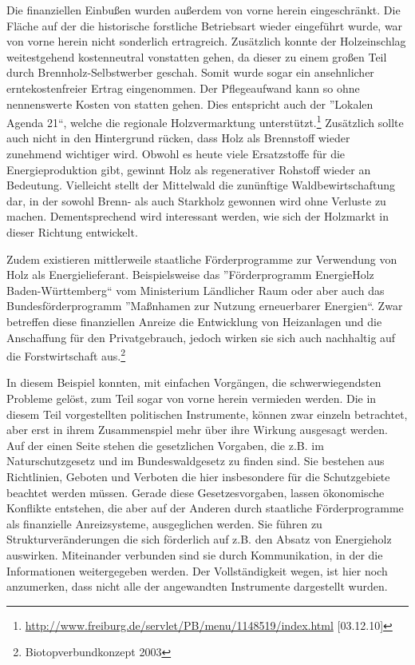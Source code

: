 \documentclass[12pt]{article}
\newcommand{\citefooturldate}[2]{\footnote{\url{#1} [#2]}}
\begin{document}
Die finanziellen Einbußen wurden außerdem von vorne herein eingeschränkt. Die Fläche auf der die historische
forstliche Betriebsart wieder eingeführt wurde, war von vorne herein nicht sonderlich ertragreich.
Zusätzlich konnte der Holzeinschlag weitestgehend kostenneutral vonstatten gehen, da dieser zu einem großen Teil
durch Brennholz-Selbstwerber geschah. Somit wurde sogar ein ansehnlicher erntekostenfreier Ertrag eingenommen.
Der Pflegeaufwand kann so ohne nennenswerte Kosten von statten gehen. Dies entspricht auch der ''Lokalen Agenda 21``,
welche die regionale Holzvermarktung unterstützt.\citefooturldate{http://www.freiburg.de/servlet/PB/menu/1148519/index.html}{03.12.10}
Zusätzlich sollte auch nicht in
den Hintergrund rücken, dass Holz als Brennstoff wieder zunehmend wichtiger wird. Obwohl es heute viele
Ersatzstoffe für die Energieproduktion gibt, gewinnt Holz als regenerativer Rohstoff wieder an Bedeutung.
Vielleicht stellt der Mittelwald die zunünftige Waldbewirtschaftung dar, in der sowohl Brenn- als auch Starkholz
gewonnen wird ohne Verluste zu machen. Dementsprechend wird interessant werden, wie sich der Holzmarkt
in dieser Richtung entwickelt. 

Zudem existieren mittlerweile staatliche Förderprogramme zur Verwendung von Holz als
Energielieferant. Beispielsweise das ''Förderprogramm EnergieHolz Baden-Württemberg`` vom Ministerium Ländlicher
Raum oder aber auch das Bundesförderprogramm ''Maßnhamen zur Nutzung erneuerbarer Energien``. Zwar betreffen
diese finanziellen Anreize die Entwicklung von Heizanlagen und die Anschaffung für den Privatgebrauch, 
jedoch wirken sie sich auch nachhaltig auf die Forstwirtschaft aus.\footnote{Biotopverbundkonzept 2003}

In diesem Beispiel konnten, mit einfachen Vorgängen, die schwerwiegendsten Probleme gelöst, zum Teil sogar 
von vorne herein vermieden werden. Die in diesem Teil vorgestellten politischen Instrumente, können zwar 
einzeln betrachtet, aber erst in ihrem Zusammenspiel mehr über ihre Wirkung ausgesagt werden.
Auf der einen Seite stehen die gesetzlichen Vorgaben, die z.B. im Naturschutzgesetz und im Bundeswaldgesetz
zu finden sind. Sie bestehen aus Richtlinien, Geboten und Verboten die hier insbesondere für die 
Schutzgebiete beachtet werden müssen. Gerade diese Gesetzesvorgaben, lassen ökonomische Konflikte entstehen,
die aber auf der Anderen durch staatliche Förderprogramme als finanzielle Anreizsysteme, ausgeglichen werden. 
Sie führen zu Strukturveränderungen die sich förderlich auf z.B. den Absatz von Energieholz auswirken. 
Miteinander verbunden sind sie durch Kommunikation,
in der die Informationen weitergegeben werden. Der Vollständigkeit wegen, ist hier noch anzumerken, dass 
nicht alle der angewandten Instrumente dargestellt wurden.
\end{document}
